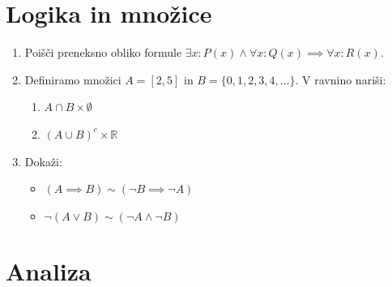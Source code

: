 \documentclass[a4paper,12pt]{article}
\begin{document}

\section*{Logika in množice}

\begin{enumerate}
\item
Poišči preneksno obliko formule \(\exists x: P(x) \wedge \forall x : Q(x) \implies \forall x : R(x)\).

\item
Definiramo množici \(A = [2,5]\) in \(B = \{0,1,2,3,4,\dots\}\).
V ravnino nariši:
\begin{enumerate}
\item \(A \cap B \times \emptyset\)
\item \((A \cup B)^c \times \mathbb{R}\)
\end{enumerate}

\item
Dokaži:
\begin{itemize}
\item \((A \implies B) \sim (\neg B \implies \neg A)\)
\item \(\neg (A \vee B) \sim (\neg A \wedge \neg B)\)
\end{itemize}
\end{enumerate}

\section*{Analiza}
\end{document}
